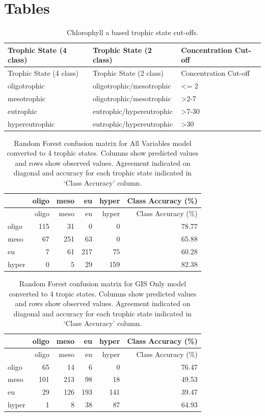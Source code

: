\documentclass[11pt,]{article}
\begin{document}
\newpage

\newpage

\newpage

\section{Tables}\label{tables}

\begin{longtable}[c]{@{}lll@{}}
\caption{Chlorophyll a based trophic state cut-offs.
\label{tab:trophicStateTable}}\tabularnewline
\toprule
Trophic State (4 class) & Trophic State (2 class) & Concentration
Cut-off\tabularnewline
\midrule
\endfirsthead
\toprule
Trophic State (4 class) & Trophic State (2 class) & Concentration
Cut-off\tabularnewline
\midrule
\endhead
oligotrophic & oligotrophic/mesotrophic & \textless{}= 2\tabularnewline
mesotrophic & oligotrophic/mesotrophic &
\textgreater{}2-7\tabularnewline
eutrophic & eutrophic/hypereutrophic & \textgreater{}7-30\tabularnewline
hypereutrophic & eutrophic/hypereutrophic &
\textgreater{}30\tabularnewline
\bottomrule
\end{longtable}

\newpage

\begin{longtable}[c]{@{}lrrrrr@{}}
\caption{Random Forest confusion matrix for All Variables model
converted to 4 trophic states. Columns show predicted values and rows
show observed values. Agreement indicated on diagonal and accuracy for
each trophic state indicated in `Class Accuracy' column.
\label{tab:Confusion_All_4}}\tabularnewline
\toprule
& oligo & meso & eu & hyper & Class Accuracy (\%)\tabularnewline
\midrule
\endfirsthead
\toprule
& oligo & meso & eu & hyper & Class Accuracy (\%)\tabularnewline
\midrule
\endhead
oligo & 115 & 31 & 0 & 0 & 78.77\tabularnewline
meso & 67 & 251 & 63 & 0 & 65.88\tabularnewline
eu & 7 & 61 & 217 & 75 & 60.28\tabularnewline
hyper & 0 & 5 & 29 & 159 & 82.38\tabularnewline
\bottomrule
\end{longtable}

\newpage

\begin{longtable}[c]{@{}lrrrrr@{}}
\caption{Random Forest confusion matrix for GIS Only model converted to
4 tropic states. Columns show predicted values and rows show observed
values. Agreement indicated on diagonal and accuracy for each trophic
state indicated in `Class Accuracy' column.
\label{tab:Confusion_GIS_4}}\tabularnewline
\toprule
& oligo & meso & eu & hyper & Class Accuracy (\%)\tabularnewline
\midrule
\endfirsthead
\toprule
& oligo & meso & eu & hyper & Class Accuracy (\%)\tabularnewline
\midrule
\endhead
oligo & 65 & 14 & 6 & 0 & 76.47\tabularnewline
meso & 101 & 213 & 98 & 18 & 49.53\tabularnewline
eu & 29 & 126 & 193 & 141 & 39.47\tabularnewline
hyper & 1 & 8 & 38 & 87 & 64.93\tabularnewline
\bottomrule
\end{longtable}
\end{document}
